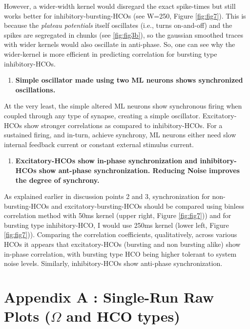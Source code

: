 \documentclass[
]{article}
\providecommand{\tightlist}{%
  \setlength{\itemsep}{0pt}\setlength{\parskip}{0pt}}
\begin{document}
However, a wider-width kernel would disregard the exact spike-times but still works better for inhibitory-bursting-HCOs (see W=250, Figure \ref{fig:fig7}). This is because the \emph{plateau potentials} itself oscillates (i.e., turns on-and-off) and the spikes are segregated in chunks (see \ref{fig:fig3b}), so the gaussian smoothed traces with wider kernels would also oscillate in anti-phase. So, one can see why the wider-kernel is more efficient in predicting correlation for bursting type inhibitory-HCOs.

\begin{enumerate}
\def\labelenumi{\arabic{enumi}.}
\setcounter{enumi}{3}
\tightlist
\item
  \textbf{Simple oscillator made using two ML neurons shows synchronized oscillations.}
\end{enumerate}

At the very least, the simple altered ML neurons show synchronous firing when coupled through any type of synapse, creating a simple oscillator. Excitatory-HCOs show stronger correlations as compared to inhibitory-HCOs. For a sustained firing, and in-turn, achieve synchrony, ML neurons either need slow internal feedback current or constant external stimulus current.

\begin{enumerate}
\def\labelenumi{\arabic{enumi}.}
\setcounter{enumi}{4}
\tightlist
\item
  \textbf{Excitatory-HCOs show in-phase synchronization and inhibitory-HCOs show ant-phase synchronization. Reducing Noise improves the degree of synchrony.}
\end{enumerate}

As explained earlier in discussion points 2 and 3, synchronization for non-bursting-HCOs and excitatory-bursting-HCOs should be compared using binless correlation method with 50ms kernel (upper right, Figure \ref{fig:fig7})) and for bursting type inhibitory-HCO, I would use 250ms kernel (lower left, Figure \ref{fig:fig7})). Comparing the correlation coefficients, qualitatively, across various HCOs it appears that excitatory-HCOs (bursting and non bursting alike) show in-phase correlation, with bursting type HCO being higher tolerant to system noise levels. Similarly, inhibitory-HCOs show anti-phase synchronization.

\clearpage

\hypertarget{appendix-appendix}{%
\appendix}


\hypertarget{appendix-a-single-run-raw-plots-omega-and-hco-types}{%
\section{\texorpdfstring{Appendix A : Single-Run Raw Plots (\(\Omega\) and HCO types)}{Appendix A : Single-Run Raw Plots (\textbackslash Omega and HCO types)}}\label{appendix-a-single-run-raw-plots-omega-and-hco-types}}
\end{document}
